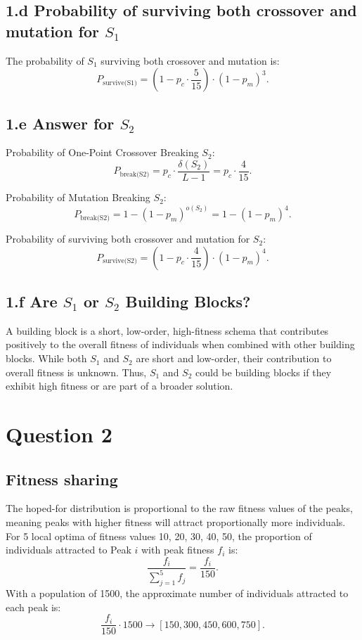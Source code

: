 \documentclass[12pt,letterpaper]{article}
\begin{document}
\subsection*{1.d Probability of surviving both crossover and mutation for \( S_1 \)}
The probability of \( S_1 \) surviving both crossover and mutation is:
\[
P_{\text{survive(S1)}} = \left( 1 - p_c \cdot \frac{5}{15} \right) \cdot (1 - p_m)^3.
\]

\subsection*{1.e Answer for \( S_2 \)}
Probability of One-Point Crossover Breaking \( S_2 \):
\[
P_{\text{break(S2)}} = p_c \cdot \frac{\delta(S_2)}{L - 1} = p_c \cdot \frac{4}{15}.
\]

Probability of Mutation Breaking \( S_2 \):
\[
P_{\text{break(S2)}} = 1 - (1 - p_m)^{o(S_2)} = 1 - (1 - p_m)^4.
\]

Probability of surviving both crossover and mutation for \( S_2 \):
\[
P_{\text{survive(S2)}} = \left( 1 - p_c \cdot \frac{4}{15} \right) \cdot (1 - p_m)^4.
\]

\subsection*{1.f Are \( S_1 \) or \( S_2 \) Building Blocks?}
A building block is a short, low-order, high-fitness schema that contributes positively to the overall fitness of individuals when combined with other building blocks.
While both \( S_1 \) and \( S_2 \) are short and low-order, their contribution to overall fitness is unknown.
Thus, \( S_1 \) and \( S_2 \) could be building blocks if they exhibit high fitness or are part of a broader solution.

\section*{Question 2}
\subsection*{Fitness sharing}
The hoped-for distribution is proportional to the raw fitness values of the peaks, meaning peaks with higher fitness will attract proportionally more individuals.
For 5 local optima of fitness values 10, 20, 30, 40, 50, the proportion of individuals attracted to Peak \( i \) with peak fitness \( f_i \) is:
\[
\frac{f_i}{\sum_{j=1}^{5} f_j} = \frac{f_i}{150}.
\]
With a population of 1500, the approximate number of individuals attracted to each peak is:
\[
\frac{f_i}{150} \cdot 1500 \rightarrow \left[150, 300, 450, 600, 750\right].
\]
\end{document}
